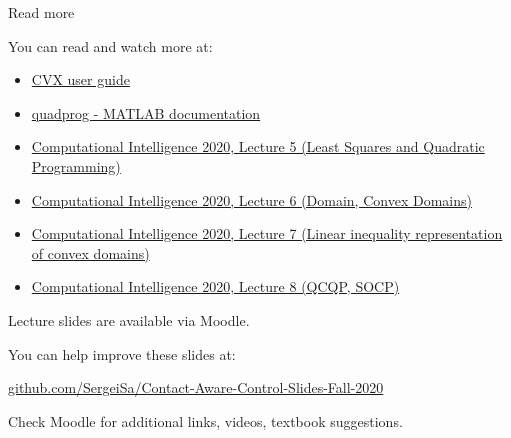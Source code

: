 \documentclass{beamer}
\begin{document}
\begin{frame}{Read more}
\begin{flushleft}

You can read and watch more at:

\begin{itemize}
    \item \href{http://web.cvxr.com/cvx/doc/}{CVX user guide}
    \item \href{https://www.mathworks.com/help/optim/ug/quadprog.html}{quadprog - MATLAB documentation}
    \item \href{https://youtu.be/bbyF89OnpBo}{Computational Intelligence 2020, Lecture 5 (Least Squares and Quadratic Programming)}
    \item \href{https://youtu.be/sVkUht9-py0}{Computational Intelligence 2020, Lecture 6 (Domain, Convex Domains)}
    \item \href{https://youtu.be/4FboGNcsQhU}{Computational Intelligence 2020, Lecture 7 (Linear inequality representation of convex domains)}
    \item \href{https://youtu.be/c4qroDnvDak}{Computational Intelligence 2020, Lecture 8 (QCQP, SOCP)}
\end{itemize}



\end{flushleft}
\end{frame}




\begin{frame}
\centerline{Lecture slides are available via Moodle.}
\bigskip
\centerline{You can help improve these slides at:}
\centerline{\href{https://github.com/SergeiSa/Contact-Aware-Control-Slides-Fall-2020}{github.com/SergeiSa/Contact-Aware-Control-Slides-Fall-2020}}
\bigskip
\centerline{Check Moodle for additional links, videos, textbook suggestions.}
\end{frame}
\end{document}
